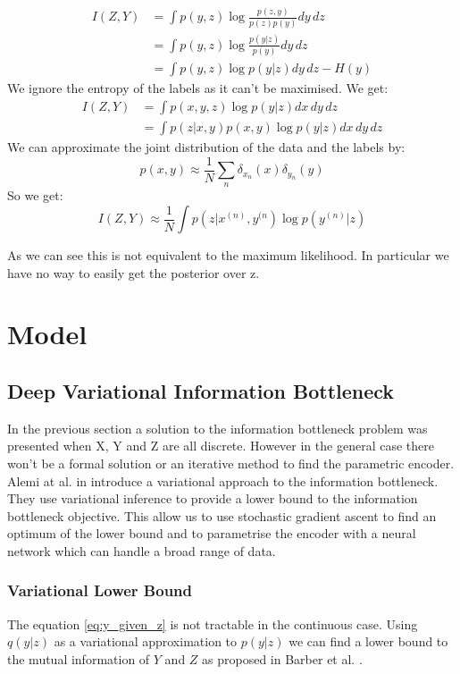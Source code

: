 \documentclass[10pt,oneside,openright]{report}
\begin{document}
\begin{align}
I(Z, Y) &= \int p(y, z) \log \frac{p(z, y)}{p(z)p(y)} dy\,dz\\
& = \int p(y, z) \log \frac{p(y|z)}{p(y)} dy\,dz\\
&= \int p(y, z) \log p(y|z) dy\,dz - H(y) 
\end{align}
We ignore the entropy of the labels as it can't be maximised. We get:
\begin{align}
I(Z, Y) &= \int p(x, y, z) \log p(y| z) dx\,dy\,dz\\
&= \int p(z | x, y) p(x, y) \log p(y | z) dx\,dy\,dz
\end{align}
We can approximate the joint distribution of the data and the labels by:
$$ p(x, y) \approx \frac{1}{N}\sum_n \delta_{x_n}(x) \delta_{y_n}(y)$$
So we get:
$$ I(Z, Y) \approx \frac{1}{N} \int p(z | x^{(n)}, y^{(n}) \log p(y^{(n)} | z) $$

As we can see this is not equivalent to the maximum likelihood. In particular we have no way to easily get the posterior over z.

\chapter{Model}
\section{Deep Variational Information Bottleneck}

In the previous section a solution to the information bottleneck problem was presented when X, Y and Z are all discrete. However in the general case there won't be a formal solution or an iterative method to find the parametric encoder. Alemi at al. in \cite{vib} introduce a variational approach to the information bottleneck. They use variational inference to provide a lower bound to the information bottleneck objective. This allow us to use stochastic gradient ascent to find an optimum of the lower bound and to parametrise the encoder with a neural network which can handle a broad range of data.

\subsection{Variational Lower Bound}

The equation \ref{eq:y_given_z} is not tractable in the continuous case. Using $q(y|z)$ as a variational approximation to $p(y|z)$ we can find a lower bound to the mutual information of $Y$ and $Z$ as proposed in Barber et al. \cite{barber}.
\end{document}
